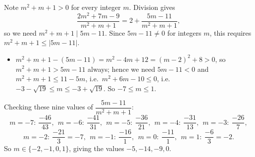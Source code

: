 Note $m^2+m+1>0$ for every integer $m$. Division gives
\[
\dfrac{2m^2+7m-9}{m^2+m+1}=2+\dfrac{5m-11}{m^2+m+1},
\]
so we need $m^2+m+1\mid 5m-11$. Since $5m-11\ne0$ for integers $m$, this requires $m^2+m+1\le|5m-11|$.
\begin{itemize}
\item $m^2+m+1-(5m-11)=m^2-4m+12=(m-2)^2+8>0$, so $m^2+m+1>5m-11$ always; hence we need $5m-11<0$ and $m^2+m+1\le11-5m$, i.e.\ $m^2+6m-10\le0$, i.e.\ $-3-\sqrt{19}\le m\le-3+\sqrt{19}$. So $-7\le m\le1$.
\end{itemize}
Checking these nine values of $\dfrac{5m-11}{m^2+m+1}$:
\[
m=-7:\ \dfrac{-46}{43},\ \ m=-6:\ \dfrac{-41}{31},\ \ m=-5:\ \dfrac{-36}{21},\ \ m=-4:\ \dfrac{-31}{13},\ \ m=-3:\ \dfrac{-26}{7},
\]
\[
m=-2:\ \dfrac{-21}{3}=-7,\ \ m=-1:\ \dfrac{-16}{1},\ \ m=0:\ \dfrac{-11}{1},\ \ m=1:\ \dfrac{-6}{3}=-2 .
\]
So $m\in\boxed{\{-2,-1,0,1\}}$, giving the values $-5,-14,-9,0$.
